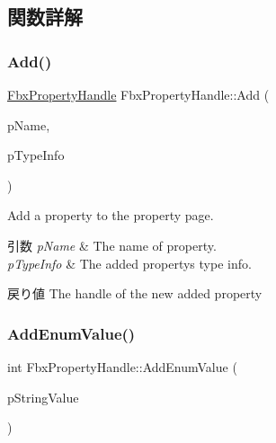 \subsection{関数詳解}
\mbox{\label{class_fbx_property_handle_afcbe2140bff2342bc216f392d6132bb6}} 
\subsubsection{\texorpdfstring{Add()}{Add()}}
{\footnotesize\ttfamily \hyperlink{class_fbx_property_handle}{Fbx\+Property\+Handle} Fbx\+Property\+Handle\+::\+Add (\begin{DoxyParamCaption}\item[{const char $\ast$}]{p\+Name,  }\item[{const \hyperlink{class_fbx_property_handle}{Fbx\+Property\+Handle} \&}]{p\+Type\+Info }\end{DoxyParamCaption})}

Add a property to the property page. 
\begin{DoxyParams}{引数}
{\em p\+Name} & The name of property. \\
\hline
{\em p\+Type\+Info} & The added property\textquotesingle{}s type info. \\
\hline
\end{DoxyParams}
\begin{DoxyReturn}{戻り値}
The handle of the new added property 
\end{DoxyReturn}
\mbox{\label{class_fbx_property_handle_acae1f5d8ca9ae53a6a926179913bea07}} 
\subsubsection{\texorpdfstring{Add\+Enum\+Value()}{AddEnumValue()}}
{\footnotesize\ttfamily int Fbx\+Property\+Handle\+::\+Add\+Enum\+Value (\begin{DoxyParamCaption}\item[{const char $\ast$}]{p\+String\+Value }\end{DoxyParamCaption})}

